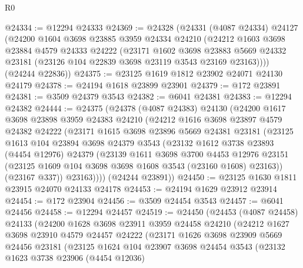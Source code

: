 \begin{lexlean}{R0}
\begin{coremodule}
@24334 := @12294 @24333
@24369 := @24328
    (@24331
      (@4087 @24334)
      @24127
      (@24200
        @1604
        @3698
        @23885
        @3959
        @24334
        @24210
        (@24212
          @1603
          @3698
          @23884
          @4579
          @24333
          @24222
          (@23171
            @1602
            @3698
            @23883
            @5669
            @24332
            @23181
            (@23126 @104 @22839 @3698 @23119 @3543 @23169 @23163))))
      (@24244 @22836))
@24375 := @23125 @1619 @1812 @23902 @24071 @24130 @24179
@24378 := @24194 @1618 @23899 @23901
@24379 := @172 @23891
@24381 := @3509 @24379 @3543
@24382 := @6041 @24381
@24383 := @12294 @24382
@24444 := @24375
    (@24378
      (@4087 @24383)
      @24130
      (@24200
        @1617
        @3698
        @23898
        @3959
        @24383
        @24210
        (@24212
          @1616
          @3698
          @23897
          @4579
          @24382
          @24222
          (@23171
            @1615
            @3698
            @23896
            @5669
            @24381
            @23181
            (@23125
              @1613
              @104
              @23894
              @3698
              @24379
              @3543
              (@23132
                @1612
                @3738
                @23893
                (@4454 @12976)
                @24379
                (@23139
                  @1611
                  @3698
                  @3700
                  @4453
                  @12976
                  @23151
                  (@23125 @1609 @104 @3698 @3698 @1608 @3543 (@23160 @1608) @23163))
                (@23167 @337))
              @23163))))
      (@24244 @23891))
@24450 := @23125 @1630 @1811 @23915 @24070 @24133 @24178
@24453 := @24194 @1629 @23912 @23914
@24454 := @172 @23904
@24456 := @3509 @24454 @3543
@24457 := @6041 @24456
@24458 := @12294 @24457
@24519 := @24450
    (@24453
      (@4087 @24458)
      @24133
      (@24200
        @1628
        @3698
        @23911
        @3959
        @24458
        @24210
        (@24212
          @1627
          @3698
          @23910
          @4579
          @24457
          @24222
          (@23171
            @1626
            @3698
            @23909
            @5669
            @24456
            @23181
            (@23125
              @1624
              @104
              @23907
              @3698
              @24454
              @3543
              (@23132
                @1623
                @3738
                @23906
                (@4454 @12036)

\end{coremodule}
\end{lexlean}
